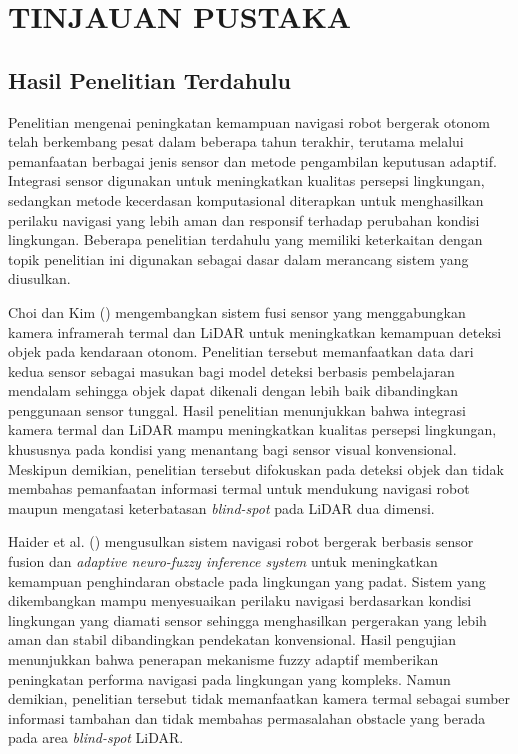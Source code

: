 \chapter{TINJAUAN PUSTAKA}
\label{chap:tinjauanpustaka}

\section{Hasil Penelitian Terdahulu}
\label{sec:hasil_terdahulu}

Penelitian mengenai peningkatan kemampuan navigasi robot bergerak otonom telah berke\-mbang pesat dalam beberapa tahun terakhir, terutama melalui pemanfaatan berbagai jenis sensor dan metode pengambilan keputusan adaptif. Integrasi sensor digunakan untuk meningkat\-kan kualitas persepsi lingkungan, sedangkan metode kecerdasan komputasional diterapkan untuk menghasilkan perilaku navigasi yang lebih aman dan responsif terhadap perubahan kondisi lingkungan. Beberapa penelitian terdahulu yang memiliki keterkaitan dengan topik penelitian ini digunakan sebagai dasar dalam merancang sistem yang diusulkan.

Choi dan Kim (\cite{Choi2023}) mengembangkan sistem fusi sensor yang menggabungkan kamera inframerah termal dan LiDAR untuk meningkatkan kemampuan deteksi objek pada kendaraan otonom. Penelitian tersebut memanfaatkan data dari kedua sensor sebagai masukan bagi model deteksi berbasis pembelajaran mendalam sehingga objek dapat dikenali dengan lebih baik dibandingkan penggunaan sensor tunggal. Hasil penelitian menunjukkan bahwa integrasi kamera termal dan LiDAR mampu meningkatkan kualitas persepsi lingkungan, khususnya pada kondisi yang menantang bagi sensor visual konvensional. Meskipun demikian, penelitian tersebut difokuskan pada deteksi objek dan tidak membahas pemanfaatan informasi termal untuk mendukung navigasi robot maupun mengatasi keterbatasan \textit{blind-spot} pada LiDAR dua dimensi.

Haider et al. (\cite{Haider2022}) mengusulkan sistem navigasi robot bergerak berbasis sensor fusion dan \textit{adaptive neuro-fuzzy inference system} untuk meningkatkan kemampuan penghindaran obstacle pada lingkungan yang padat. Sistem yang dikembangkan mampu men\-yesuaikan perilaku navigasi berdasarkan kondisi lingkungan yang diamati sensor sehingga me\-nghasilkan pergerakan yang lebih aman dan stabil dibandingkan pendekatan konvensional. Hasil pengujian menunjukkan bahwa penerapan mekanisme fuzzy adaptif memberikan peningkatan performa navigasi pada lingkungan yang kompleks. Namun demikian, penelitian tersebut tidak memanfaatkan kamera termal sebagai sumber informasi tambahan dan tidak membahas permasalahan obstacle yang berada pada area \textit{blind-spot} LiDAR.

